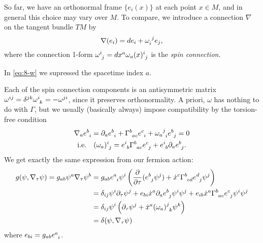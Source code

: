 So far, we have an orthonormal frame $\{e_i (x)\}$ at each point $x \in M$, and in general this choice may vary over $M$.
To compare, we introduce a connection $\nabla$ on the tangent bundle $T M$ by 
\begin{equation}
  \label{eq:8-w}
  \nabla (e_{i}) = d e_i + \omega\indices{_{i}^{j}} e_{j},
\end{equation}
where the connection 1-form $\omega\indices{^{i}_{j}} = dx^{a} \omega_{a}(x)\indices{^{i}_{j}}$ is the \emph{spin connection}.
\begin{remark}
  In \eqref{eq:8-w} we supressed the spacetime index $a$.
\end{remark}
Each of the spin connection components is an antisymmetric matrix $\omega^{ij} = \delta^{jk} \omega\indices{^{i}_{k}} = - \omega^{ji}$, since it preserves orthonormality.
A priori, $\omega$ has nothing to do with $\Gamma$, but we usually (basically always) impose compatibility by the torsion-free condition
\begin{gather}
  \nabla_a e\indices{^{b}_{i}} = \partial_{a} e\indices{^{b}_{i}} + \Gamma\indices{^{b}_{ac}} e\indices{^{c}_{i}} + \omega_{a}{}\indices{^{j}_{i}} e\indices{^{b}_{j}} = 0 \\
  \text{i.e.} \quad (\omega_a)\indices{^{i}_{j}} = e\indices{^{i}_{b}} \Gamma\indices{^{b}_{ac}} e\indices{^{c}_{j}} + e\indices{^{i}_{b}} \partial_{a} e\indices{^{b}_{j}}.
\end{gather}
We get exactly the same expression from our fermion action:
\begin{align}
  g (\psi, \nabla_\tau \psi) = g_{ab} \psi^{a} \nabla_\tau \psi^{b} &= g_{ab} e\indices{^{a}_{i}} \psi^{i} \left( \frac{\partial }{\partial \tau} (e\indices{^{b}_{j}} \psi^{j}) + \dot{x}^{c} \Gamma\indices{^{b}_{cd}} e\indices{^{d}_{j}} \psi^{j} \right) \\
				       &= \delta_{ij} \psi^{i} \partial_{\tau} \psi^{j} + e_{bi} \dot{x}^{a} \partial_{a} e\indices{^{b}_{j}} \psi^{i} \psi^{j} + e_{ib} \dot{x}^{a} \Gamma\indices{^{b}_{ac}} e\indices{^{c}_{j}} \psi^{i} \psi^{j} \\
				       &= \delta_{ij} \psi^{i} \left( \partial_{\tau} \psi^{j} + \dot{x}^{a} (\omega_a)\indices{^{j}_{k}} \psi^{k} \right) \\
				       &= \delta(\psi, \nabla_\tau \psi)
\end{align}
where $e_{bi} = g_{ab} e\indices{^{a}_{i}}$.
